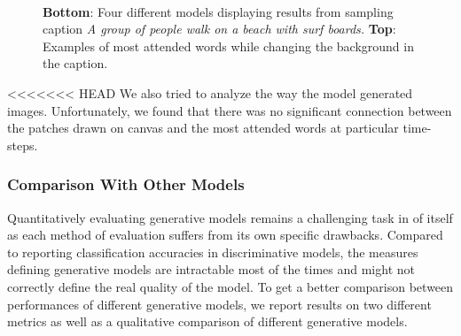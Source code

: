 \documentclass{article} %
\begin{document}
\begin{figure}[!t]
\begin{center}
\\
%
\quad
%
\quad
%
\quad
%
\quad
%
\end{center}
\caption{\textbf{Bottom}: Four different models displaying results from sampling caption \textit{A group of people walk on a beach with surf boards.} \textbf{Top}: Examples of most attended words while changing the background in the caption.}
\label{fig:diffmodels}
\end{figure}

<<<<<<< HEAD
We also tried to analyze the way the model generated images. Unfortunately, we found that there was no significant connection between the patches drawn on canvas and the most attended words at particular time-steps.

\subsubsection{Comparison With Other Models}
Quantitatively evaluating generative models remains a challenging task in of itself as each method of evaluation suffers from its own specific drawbacks. Compared to reporting classification accuracies in discriminative models, the measures defining generative models are intractable most of the times and might not correctly define the real quality of the model. To get a better comparison between performances of different generative models, we report results on two different metrics as well as a qualitative comparison of different generative models.
\end{document}
